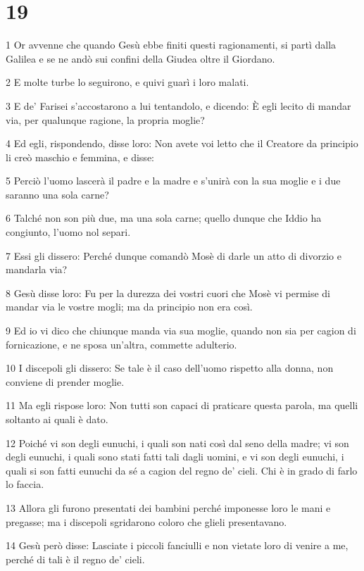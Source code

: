 \chapter{19}

\par 1 Or avvenne che quando Gesù ebbe finiti questi ragionamenti, si partì dalla Galilea e se ne andò sui confini della Giudea oltre il Giordano.
\par 2 E molte turbe lo seguirono, e quivi guarì i loro malati.
\par 3 E de' Farisei s'accostarono a lui tentandolo, e dicendo: È egli lecito di mandar via, per qualunque ragione, la propria moglie?
\par 4 Ed egli, rispondendo, disse loro: Non avete voi letto che il Creatore da principio li creò maschio e femmina, e disse:
\par 5 Perciò l'uomo lascerà il padre e la madre e s'unirà con la sua moglie e i due saranno una sola carne?
\par 6 Talché non son più due, ma una sola carne; quello dunque che Iddio ha congiunto, l'uomo nol separi.
\par 7 Essi gli dissero: Perché dunque comandò Mosè di darle un atto di divorzio e mandarla via?
\par 8 Gesù disse loro: Fu per la durezza dei vostri cuori che Mosè vi permise di mandar via le vostre mogli; ma da principio non era così.
\par 9 Ed io vi dico che chiunque manda via sua moglie, quando non sia per cagion di fornicazione, e ne sposa un'altra, commette adulterio.
\par 10 I discepoli gli dissero: Se tale è il caso dell'uomo rispetto alla donna, non conviene di prender moglie.
\par 11 Ma egli rispose loro: Non tutti son capaci di praticare questa parola, ma quelli soltanto ai quali è dato.
\par 12 Poiché vi son degli eunuchi, i quali son nati così dal seno della madre; vi son degli eunuchi, i quali sono stati fatti tali dagli uomini, e vi son degli eunuchi, i quali si son fatti eunuchi da sé a cagion del regno de' cieli. Chi è in grado di farlo lo faccia.
\par 13 Allora gli furono presentati dei bambini perché imponesse loro le mani e pregasse; ma i discepoli sgridarono coloro che glieli presentavano.
\par 14 Gesù però disse: Lasciate i piccoli fanciulli e non vietate loro di venire a me, perché di tali è il regno de' cieli.
